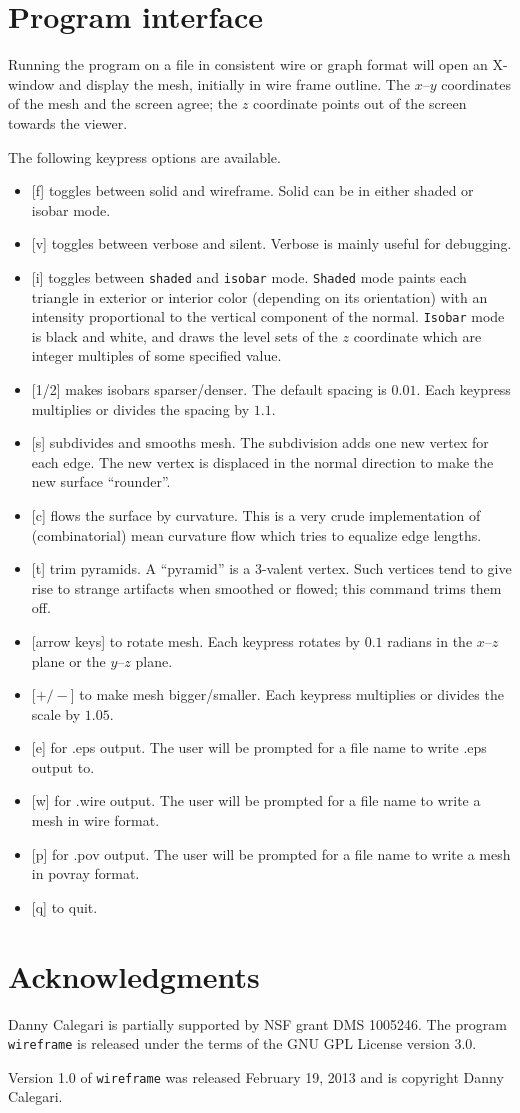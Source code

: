 \documentclass[12pt]{article}
\begin{document}
\section{Program interface}\label{section:interface}

Running the program on a file in consistent wire or graph format will open an X-window
and display the mesh, initially in wire frame outline. The $x$--$y$ coordinates of the
mesh and the screen agree; the $z$ coordinate points out of the screen towards the viewer.

The following keypress options are available.

\begin{itemize}
\item{[f] toggles between solid and wireframe. Solid can be in either shaded or isobar mode.}
\item{[v] toggles between verbose and silent. Verbose is mainly useful for debugging.}
\item{[i] toggles between {\tt shaded} and {\tt isobar} mode. {\tt Shaded} mode paints each triangle in 
exterior or interior color (depending on its orientation) with an intensity proportional to the
vertical component of the normal. {\tt Isobar} mode is black and white, and draws the level
sets of the $z$ coordinate which are integer multiples of some specified value.}
\item{[1/2] makes isobars sparser/denser. The default spacing is $0.01$. Each keypress multiplies
or divides the spacing by $1.1$.}
\item{[s] subdivides and smooths mesh. The subdivision adds one new vertex for each edge. The new vertex
is displaced in the normal direction to make the new surface ``rounder''.}
\item{[c] flows the surface by curvature. This is a very crude implementation of (combinatorial) mean
curvature flow which tries to equalize edge lengths.}
\item{[t] trim pyramids. A ``pyramid'' is a 3-valent vertex. Such vertices tend to give rise to
strange artifacts when smoothed or flowed; this command trims them off.}
\item{[arrow keys] to rotate mesh. Each keypress rotates by $0.1$ radians in the $x$--$z$ plane or
the $y$--$z$ plane.}
\item{[$+/-$] to make mesh bigger/smaller. Each keypress multiplies or divides the scale by $1.05$.}
\item{[e] for .eps output. The user will be prompted for a file name to write .eps output to.}
\item{[w] for .wire output. The user will be prompted for a file name to write a mesh in
wire format.}
\item{[p] for .pov output. The user will be prompted for a file name to write a mesh in
povray format.}
\item{[q] to quit.}
\end{itemize}

\section{Acknowledgments}
Danny Calegari is partially supported by NSF grant DMS 1005246. The program {\tt wireframe} is
released under the terms of the GNU GPL License version 3.0.

\medskip

\noindent Version 1.0 of {\tt wireframe} was released February 19, 2013 and is copyright Danny Calegari.
\end{document}
